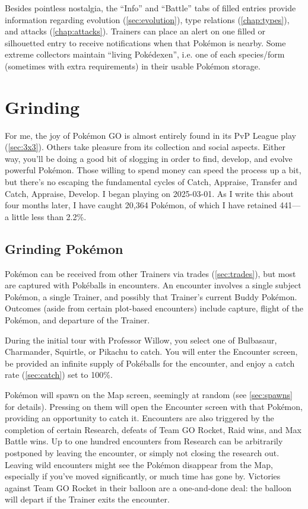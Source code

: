 Besides pointless nostalgia, the ``Info'' and ``Battle'' tabs of filled entries
  provide information regarding evolution (\autoref{sec:evolution}), type
  relations (\autoref{chap:types}), and attacks (\autoref{chap:attacks}).
Trainers can place an alert on one filled or silhouetted entry to receive
  notifications when that Pokémon is nearby.
Some extreme collectors maintain ``living Pokédexen'', i.e. one of each
  species/form (sometimes with extra requirements) in their usable Pokémon storage.

\section{Grinding}
\label{sec:grinding}
For me, the joy of Pokémon GO is almost entirely found in its PvP League play (\autoref{sec:3x3}).
Others take pleasure from its collection and social aspects.
Either way, you'll be doing a good bit of slogging in order to find, develop,
  and evolve powerful Pokémon.
Those willing to spend money can speed the process up a bit, but there's
  no escaping the fundamental cycles of Catch, Appraise, Transfer and
  Catch, Appraise, Develop. 
I began playing on 2025-03-01.
As I write this about four months later, I have caught 20,364 Pokémon, of which
  I have retained 441---a little less than 2.2\%.

\subsection{Grinding Pokémon}
\label{subsec:getmons}
Pokémon can be received from other Trainers via trades (\autoref{sec:trades}),
  but most are captured with Pokéballs in encounters.
An encounter involves a single subject Pokémon, a single Trainer,
  and possibly that Trainer's current Buddy Pokémon.
Outcomes (aside from certain plot-based encounters) include capture, flight of
  the Pokémon, and departure of the Trainer.

During the initial tour with Professor Willow, you select one of
 Bulbasaur, Charmander, Squirtle, or Pikachu to catch.
You will enter the Encounter screen, be provided an infinite supply of
  Pokéballs for the encounter, and enjoy a catch rate (\autoref{sec:catch}) set to 100\%.

Pokémon will spawn on the Map screen, seemingly at random (see \autoref{sec:spawns} for details).
Pressing on them will open the Encounter screen with that Pokémon,
  providing an opportunity to catch it.
Encounters are also triggered by the completion of certain Research,
  defeats of Team GO Rocket, Raid wins, and Max Battle wins.
Up to one hundred encounters from Research can be arbitrarily postponed by leaving the encounter,
  or simply not closing the research out.
Leaving wild encounters might see the Pokémon disappear from the Map, especially
  if you've moved significantly, or much time has gone by.
Victories against Team GO Rocket in their balloon are a one-and-done deal:
  the balloon will depart if the Trainer exits the encounter.


